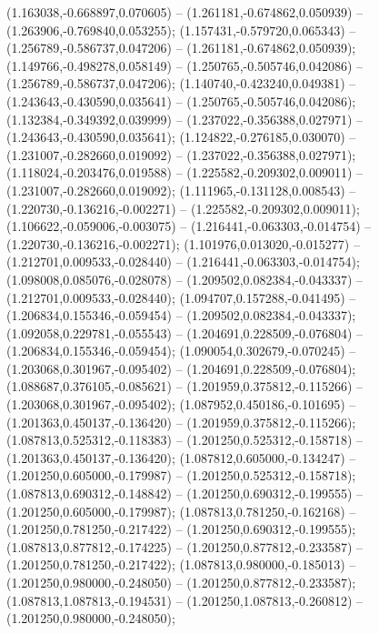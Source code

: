  (1.163038,-0.668897,0.070605) -- (1.261181,-0.674862,0.050939) -- (1.263906,-0.769840,0.053255);
 (1.157431,-0.579720,0.065343) -- (1.256789,-0.586737,0.047206) -- (1.261181,-0.674862,0.050939);
 (1.149766,-0.498278,0.058149) -- (1.250765,-0.505746,0.042086) -- (1.256789,-0.586737,0.047206);
 (1.140740,-0.423240,0.049381) -- (1.243643,-0.430590,0.035641) -- (1.250765,-0.505746,0.042086);
 (1.132384,-0.349392,0.039999) -- (1.237022,-0.356388,0.027971) -- (1.243643,-0.430590,0.035641);
 (1.124822,-0.276185,0.030070) -- (1.231007,-0.282660,0.019092) -- (1.237022,-0.356388,0.027971);
 (1.118024,-0.203476,0.019588) -- (1.225582,-0.209302,0.009011) -- (1.231007,-0.282660,0.019092);
 (1.111965,-0.131128,0.008543) -- (1.220730,-0.136216,-0.002271) -- (1.225582,-0.209302,0.009011);
 (1.106622,-0.059006,-0.003075) -- (1.216441,-0.063303,-0.014754) -- (1.220730,-0.136216,-0.002271);
 (1.101976,0.013020,-0.015277) -- (1.212701,0.009533,-0.028440) -- (1.216441,-0.063303,-0.014754);
 (1.098008,0.085076,-0.028078) -- (1.209502,0.082384,-0.043337) -- (1.212701,0.009533,-0.028440);
 (1.094707,0.157288,-0.041495) -- (1.206834,0.155346,-0.059454) -- (1.209502,0.082384,-0.043337);
 (1.092058,0.229781,-0.055543) -- (1.204691,0.228509,-0.076804) -- (1.206834,0.155346,-0.059454);
 (1.090054,0.302679,-0.070245) -- (1.203068,0.301967,-0.095402) -- (1.204691,0.228509,-0.076804);
 (1.088687,0.376105,-0.085621) -- (1.201959,0.375812,-0.115266) -- (1.203068,0.301967,-0.095402);
 (1.087952,0.450186,-0.101695) -- (1.201363,0.450137,-0.136420) -- (1.201959,0.375812,-0.115266);
 (1.087813,0.525312,-0.118383) -- (1.201250,0.525312,-0.158718) -- (1.201363,0.450137,-0.136420);
 (1.087812,0.605000,-0.134247) -- (1.201250,0.605000,-0.179987) -- (1.201250,0.525312,-0.158718);
 (1.087813,0.690312,-0.148842) -- (1.201250,0.690312,-0.199555) -- (1.201250,0.605000,-0.179987);
 (1.087813,0.781250,-0.162168) -- (1.201250,0.781250,-0.217422) -- (1.201250,0.690312,-0.199555);
 (1.087813,0.877812,-0.174225) -- (1.201250,0.877812,-0.233587) -- (1.201250,0.781250,-0.217422);
 (1.087813,0.980000,-0.185013) -- (1.201250,0.980000,-0.248050) -- (1.201250,0.877812,-0.233587);
 (1.087813,1.087813,-0.194531) -- (1.201250,1.087813,-0.260812) -- (1.201250,0.980000,-0.248050);
